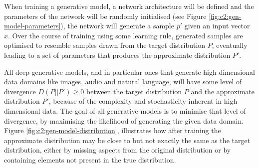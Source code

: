 When training a generative model, a network architecture will be defined and the parameters of the network will be randomly initialised (see Figure \ref{fig:c2:gen-model-parameters}), the network will generate a sample $p'$ given an input vector $x$. 
Over the course of training using some learning rule, generated samples are optimised to resemble samples drawn from the target distribution $P$, eventually leading to a set of parameters that produces the approximate distribution $P'$.


All deep generative models, and in particular ones that generate high dimensional data domains like images, audio and natural language, will have some level of divergence $D(P||P') \geq 0$ between the target distribution $P$ and the approximate distribution $P'$, because of the complexity and stochasticity inherent in high dimensional data. 
The goal of all generative models is to minimise that level of divergence, by maximising the likelihood of generating the given data domain. 
Figure \ref{fig:c2:gen-model-distribution}, illustrates how after training the approximate distribution may be close to but not exactly the same as the target distribution, either by missing aspects from the original distribution or by containing elements not present in the true distribution. 



